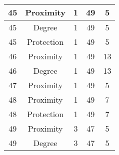 \documentclass[results.tex]{subfiles}
\begin{document}
\begin{center}
\begin{tabular}{| c || c | c | c | c |}
            \hline
            45                      & Proximity                    & 1                      & 49                      & 5                    \\
            \hline
            45                      & Degree                       & 1                      & 49                      & 5                    \\
            \hline
            45                      & Protection                   & 1                      & 49                      & 5                    \\
            \hline
            46                      & Proximity                    & 1                      & 49                      & 13                   \\
            \hline
            46                      & Degree                       & 1                      & 49                      & 13                   \\
            \hline
            47                      & Proximity                    & 1                      & 49                      & 5                    \\
            \hline
            48                      & Proximity                    & 1                      & 49                      & 7                    \\
            \hline
            48                      & Protection                   & 1                      & 49                      & 7                    \\
            \hline
            49                      & Proximity                    & 3                      & 47                      & 5                    \\
            \hline
            49                      & Degree                       & 3                      & 47                      & 5                    \\
            \hline
        \end{tabular}
    \end{center}
\end{document}
